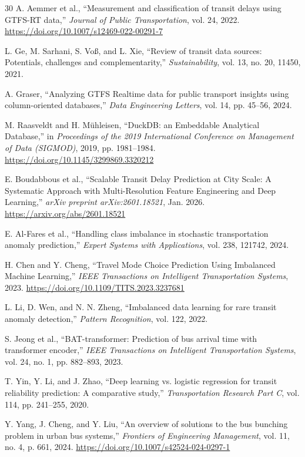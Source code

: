\documentclass[journal,twocolumn]{IEEEtran}
\begin{document}
\begin{thebibliography}{30}
	 A. Aemmer et al., ``Measurement and classification of transit delays using GTFS-RT data,'' \textit{Journal of Public Transportation}, vol. 24, 2022. \url{https://doi.org/10.1007/s12469-022-00291-7}

	 L. Ge, M. Sarhani, S. Voß, and L. Xie, ``Review of transit data sources: Potentials, challenges and complementarity,'' \textit{Sustainability}, vol. 13, no. 20, 11450, 2021.

	 A. Graser, ``Analyzing GTFS Realtime data for public transport insights using column-oriented databases,'' \textit{Data Engineering Letters}, vol. 14, pp. 45--56, 2024.

	 M. Raasveldt and H. Mühleisen, ``DuckDB: an Embeddable Analytical Database,'' in \textit{Proceedings of the 2019 International Conference on Management of Data (SIGMOD)}, 2019, pp. 1981--1984. \url{https://doi.org/10.1145/3299869.3320212}

	 E. Boudabbous et al., ``Scalable Transit Delay Prediction at City Scale: A Systematic Approach with Multi-Resolution Feature Engineering and Deep Learning,'' \textit{arXiv preprint arXiv:2601.18521}, Jan. 2026. \url{https://arxiv.org/abs/2601.18521}

	 E. Al-Fares et al., ``Handling class imbalance in stochastic transportation anomaly prediction,'' \textit{Expert Systems with Applications}, vol. 238, 121742, 2024.

	 H. Chen and Y. Cheng, ``Travel Mode Choice Prediction Using Imbalanced Machine Learning,'' \textit{IEEE Transactions on Intelligent Transportation Systems}, 2023. \url{https://doi.org/10.1109/TITS.2023.3237681}

	 L. Li, D. Wen, and N. N. Zheng, ``Imbalanced data learning for rare transit anomaly detection,'' \textit{Pattern Recognition}, vol. 122, 2022.

	 S. Jeong et al., ``BAT-transformer: Prediction of bus arrival time with transformer encoder,'' \textit{IEEE Transactions on Intelligent Transportation Systems}, vol. 24, no. 1, pp. 882--893, 2023.

	 T. Yin, Y. Li, and J. Zhao, ``Deep learning vs. logistic regression for transit reliability prediction: A comparative study,'' \textit{Transportation Research Part C}, vol. 114, pp. 241--255, 2020.

	 Y. Yang, J. Cheng, and Y. Liu, ``An overview of solutions to the bus bunching problem in urban bus systems,'' \textit{Frontiers of Engineering Management}, vol. 11, no. 4, p. 661, 2024. \url{https://doi.org/10.1007/s42524-024-0297-1}


\end{thebibliography}
\end{document}
